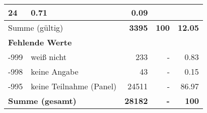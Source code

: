 \begin{longtable}{lXrrr}
       \num{24} &
       \num[round-mode=places,round-precision=2]{0,71} &
         \num[round-mode=places,round-precision=2]{0,09} \\
     \midrule
     \multicolumn{2}{l}{Summe (gültig)} &
       \textbf{\num{3395}} &
     \textbf{100} &
       \textbf{\num[round-mode=places,round-precision=2]{12,05}} \\
     \multicolumn{5}{l}{\textbf{Fehlende Werte}}\\
       -999 &
       weiß nicht &
         \num{233} &
        - &
         \num[round-mode=places,round-precision=2]{0,83} \\
       -998 &
       keine Angabe &
         \num{43} &
        - &
         \num[round-mode=places,round-precision=2]{0,15} \\
       -995 &
       keine Teilnahme (Panel) &
         \num{24511} &
        - &
         \num[round-mode=places,round-precision=2]{86,97} \\
     \midrule
     \multicolumn{2}{l}{\textbf{Summe (gesamt)}} &
          \textbf{\num{28182}} &
        \textbf{-} &
        \textbf{100} \\
     \bottomrule
     \end{longtable}
     
